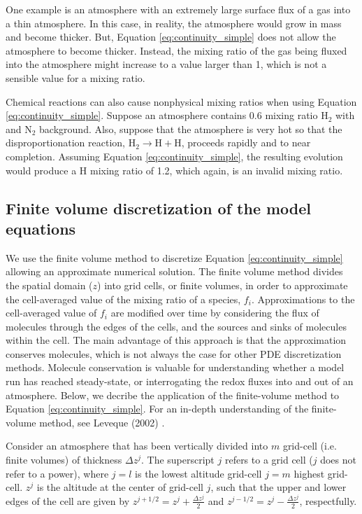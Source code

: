 One example is an atmosphere with an extremely large surface flux of a gas into a thin atmosphere. In this case, in reality, the atmosphere would grow in mass and become thicker. But, Equation \eqref{eq:continuity_simple} does not allow the atmosphere to become thicker. Instead, the mixing ratio of the gas being fluxed into the atmosphere might increase to a value larger than 1, which is not a sensible value for a mixing ratio.

Chemical reactions can also cause nonphysical mixing ratios when using Equation \eqref{eq:continuity_simple}. Suppose an atmosphere contains 0.6 mixing ratio H$_2$ with and N$_2$ background. Also, suppose that the atmosphere is very hot so that the disproportionation reaction, $\mathrm{H_2} \rightarrow \mathrm{H} + \mathrm{H}$, proceeds rapidly and to near completion. Assuming Equation \eqref{eq:continuity_simple}, the resulting evolution would produce a H mixing ratio of 1.2, which again, is an invalid mixing ratio.

\subsection{Finite volume discretization of the model equations} \label{sec:finite_volume}

We use the finite volume method to discretize Equation \eqref{eq:continuity_simple} allowing an approximate numerical solution. The finite volume method divides the spatial domain ($z$) into grid cells, or finite volumes, in order to approximate the cell-averaged value of the mixing ratio of a species, $f_i$. Approximations to the cell-averaged value of $f_i$ are modified over time by considering the flux of molecules through the edges of the cells, and the sources and sinks of molecules within the cell. The main advantage of this approach is that the approximation conserves molecules, which is not always the case for other PDE discretization methods. Molecule conservation is valuable for understanding whether a model run has reached steady-state, or interrogating the redox fluxes into and out of an atmosphere. Below, we decribe the application of the finite-volume method to Equation \eqref{eq:continuity_simple}. For an in-depth understanding of the finite-volume method, see Leveque (2002) \cite{Leveque_2002}.

Consider an atmosphere that has been vertically divided into $m$ grid-cell (i.e. finite volumes) of thickness $\Delta z^j$. The superscript $j$ refers to a grid cell ($j$ does not refer to a power), where $j = l$ is the lowest altitude grid-cell $j = m$ highest grid-cell. $z^j$ is the altitude at the center of grid-cell $j$, such that the upper and lower edges of the cell are given by $z^{j+1/2} = z^j + \frac{\Delta z^j}{2}$ and $z^{j-1/2} = z^j - \frac{\Delta z^j}{2}$, respectfully.

